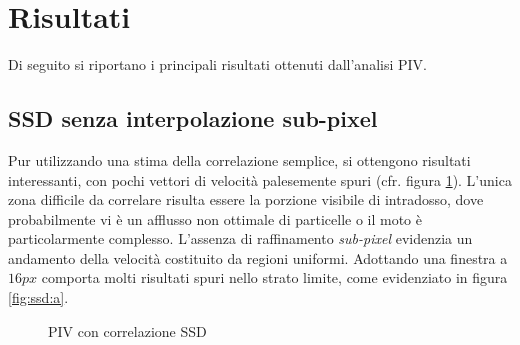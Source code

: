 \documentclass[a4paper]{article}
\begin{document}
\section{Risultati}

Di seguito si riportano i principali risultati ottenuti dall'analisi PIV.

\subsection{SSD senza interpolazione sub-pixel}

Pur utilizzando una stima della correlazione semplice, si ottengono risultati interessanti, con pochi vettori di velocità palesemente spuri (cfr. figura \ref{fig:ssd}). L'unica zona difficile da correlare risulta essere la porzione visibile di intradosso, dove probabilmente vi è un afflusso non ottimale di particelle o il moto è particolarmente complesso. L'assenza di raffinamento \textit{sub-pixel} evidenzia un andamento della velocità costituito da regioni uniformi. Adottando una finestra a $16px$ comporta molti risultati spuri nello strato limite, come evidenziato in figura \ref{fig:ssd:a}.

\begin{figure}[h]
	\centering
	\caption{PIV con correlazione SSD}
	\label{fig:ssd}
\end{figure}
\end{document}
